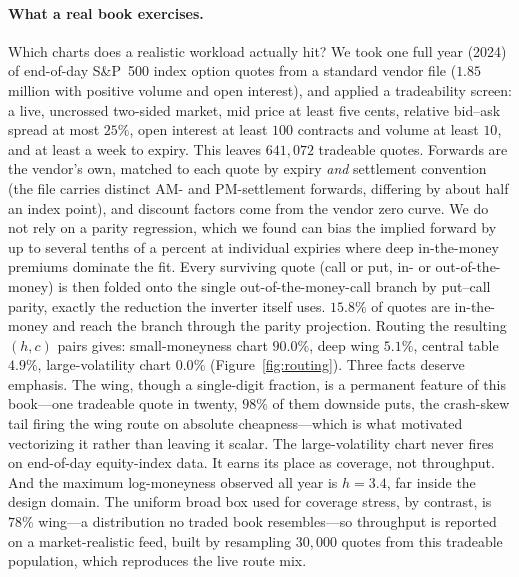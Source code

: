 \documentclass[11pt]{article}
\begin{document}
\paragraph{What a real book exercises.}
Which charts does a realistic workload actually hit? We took one full year (2024) of end-of-day S\&P~500 index option quotes from a standard vendor file ($1.85$ million with positive volume and open interest), and applied a tradeability screen: a live, uncrossed two-sided market, mid price at least five cents, relative bid--ask spread at most $25\%$, open interest at least $100$ contracts and volume at least $10$, and at least a week to expiry. This leaves $641{,}072$ tradeable quotes. Forwards are the vendor's own, matched to each quote by expiry \emph{and} settlement convention (the file carries distinct AM- and PM-settlement forwards, differing by about half an index point), and discount factors come from the vendor zero curve. We do not rely on a parity regression, which we found can bias the implied forward by up to several tenths of a percent at individual expiries where deep in-the-money premiums dominate the fit. Every surviving quote (call or put, in- or out-of-the-money) is then folded onto the single out-of-the-money-call branch by put--call parity, exactly the reduction the inverter itself uses. $15.8\%$ of quotes are in-the-money and reach the branch through the parity projection. Routing the resulting $(h,c)$ pairs gives: small-moneyness chart $90.0\%$, deep wing $5.1\%$, central table $4.9\%$, large-volatility chart $0.0\%$ (Figure~\ref{fig:routing}). Three facts deserve emphasis. The wing, though a single-digit fraction, is a permanent feature of this book---one tradeable quote in twenty, $98\%$ of them downside puts, the crash-skew tail \citep{hagan2002smile} firing the wing route on absolute cheapness---which is what motivated vectorizing it rather than leaving it scalar. The large-volatility chart never fires on end-of-day equity-index data. It earns its place as coverage, not throughput. And the maximum log-moneyness observed all year is $h=3.4$, far inside the design domain. The uniform broad box used for coverage stress, by contrast, is $78\%$ wing---a distribution no traded book resembles---so throughput is reported on a market-realistic feed, built by resampling $30{,}000$ quotes from this tradeable population, which reproduces the live route mix.
\end{document}

